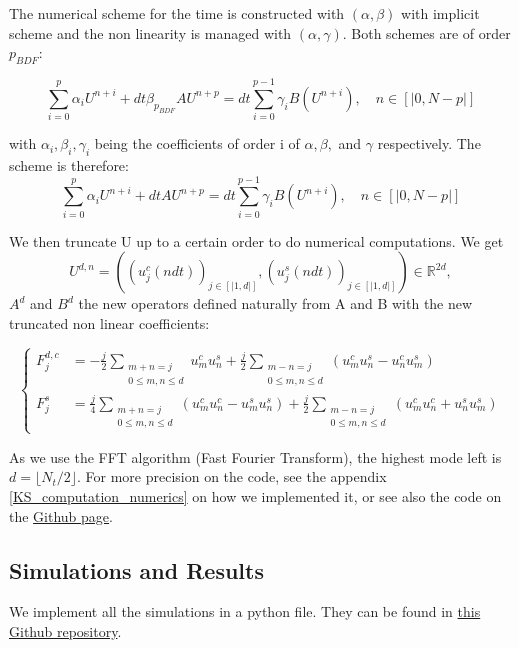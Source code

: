 \documentclass[12pt]{article}
\begin{document}
The numerical scheme for the time is constructed with $(\alpha, \beta)$ with implicit scheme and the non linearity is managed with $(\alpha, \gamma)$. Both schemes are of order $p_{BDF}$:

\begin{equation}
    \sum_{i=0}^p \alpha_i U^{n+i} + dt\beta_{p_{BDF}}AU^{n+p} = dt\sum_{i=0}^{p-1} \gamma_iB(U^{n+i}), \quad n\in [|0, N-p|]
\end{equation}

with $\alpha_i, \beta_i, \gamma_i$ being the coefficients of order i of $\alpha, \beta,$ and $\gamma$ respectively. The scheme is therefore: 
\\

\begin{equation}
    \boxed{
    \sum_{i=0}^p \alpha_i U^{n+i} + dtAU^{n+p} = dt\sum_{i=0}^{p-1} \gamma_iB(U^{n+i}), \quad n\in [|0, N-p|]
    }
\end{equation}

We then truncate U up to a certain order to do numerical computations. We get $$U^{d, n} = \left((u_j^c(ndt))_{j\in [|1,d|]}, (u_j^s(ndt))_{j\in [|1,d|]} \right)\in \mathbb{R}^{2d},$$ 
$A^d$ and $B^d$ the new operators defined naturally from A and B with the new truncated non linear coefficients:

\begin{equation}
\left\{
\begin{aligned}
    F_j^{d,c} &= -\frac{j}{2} \sum_{\substack{m+n=j \\ 0\leq m, n \leq d}}u_m^cu_n^s + \frac{j}{2} \sum_{\substack{m-n=j\\ 0\leq m, n \leq d}}(u_m^cu_n^s - u_n^cu_m^s) \\
    F_j^s &= \frac{j}{4} \sum_{\substack{m+n=j \\ 0\leq m, n \leq d}}(u_m^cu_n^c - u_m^su_n^s)+ \frac{j}{2} \sum_{\substack{m-n=j \\ 0\leq m, n \leq d}}(u_m^cu_n^c + u_n^su_m^s)    
\end{aligned}
\right.
\end{equation}


As we use the FFT algorithm (Fast Fourier Transform), the highest mode left is $d =\lfloor N_t/2 \rfloor.$ For more precision on the code, see the appendix \ref{KS_computation_numerics} on how we implemented it, or see also the code on the \href{https://github.com/Bilal59170/Repo_Warwick_internship}{Github page}. 

\subsection{Simulations and Results}
We implement all the simulations in a python file. They can be found in \href{https://github.com/Bilal59170/Repo_Warwick_internship}{this Github repository}.
\end{document}
